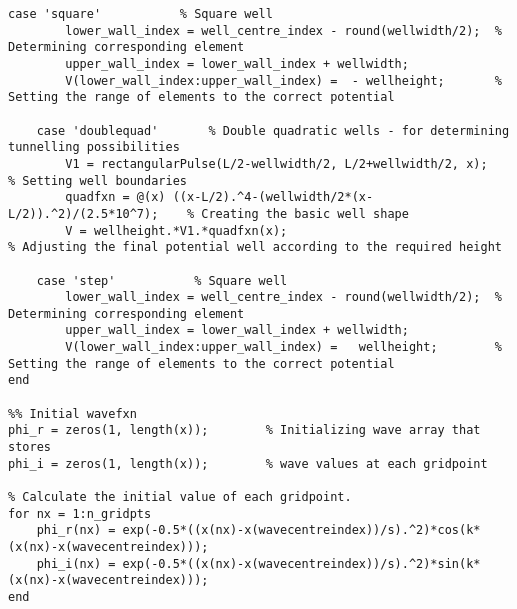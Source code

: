 \documentclass[11pt, oneside]{article}   	%
\begin{document}
{\begin{Verbatim}[commandchars=\\\{\}]
    case 'square'           % Square well
        lower_wall_index = well_centre_index - round(wellwidth/2);  % Determining corresponding element
        upper_wall_index = lower_wall_index + wellwidth;
        V(lower_wall_index:upper_wall_index) =  - wellheight;       % Setting the range of elements to the correct potential
    
    case 'doublequad'       % Double quadratic wells - for determining tunnelling possibilities
        V1 = rectangularPulse(L/2-wellwidth/2, L/2+wellwidth/2, x);         % Setting well boundaries
        quadfxn = @(x) ((x-L/2).^4-(wellwidth/2*(x-L/2)).^2)/(2.5*10^7);    % Creating the basic well shape
        V = wellheight.*V1.*quadfxn(x);                                     % Adjusting the final potential well according to the required height

    case 'step'           % Square well
        lower_wall_index = well_centre_index - round(wellwidth/2);  % Determining corresponding element
        upper_wall_index = lower_wall_index + wellwidth;
        V(lower_wall_index:upper_wall_index) =   wellheight;        % Setting the range of elements to the correct potential
end

%% Initial wavefxn
phi_r = zeros(1, length(x));        % Initializing wave array that stores 
phi_i = zeros(1, length(x));        % wave values at each gridpoint

% Calculate the initial value of each gridpoint. 
for nx = 1:n_gridpts
    phi_r(nx) = exp(-0.5*((x(nx)-x(wavecentreindex))/s).^2)*cos(k*(x(nx)-x(wavecentreindex)));
    phi_i(nx) = exp(-0.5*((x(nx)-x(wavecentreindex))/s).^2)*sin(k*(x(nx)-x(wavecentreindex)));
end
\end{Verbatim}
}
\end{document}
